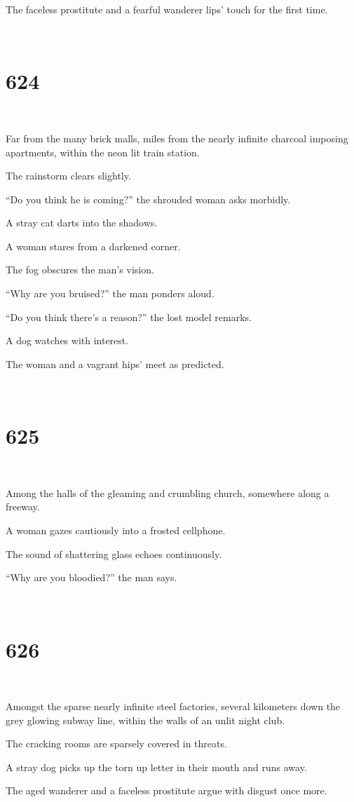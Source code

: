 \documentclass{report}
\begin{document}
The faceless prostitute and a fearful wanderer lips' touch for the first time.

~
\chapter*{624}
~

Far from the many brick malls, miles from the nearly infinite charcoal imposing apartments, within the neon lit train station.

The rainstorm clears slightly.

``Do you think he is coming?'' the shrouded woman asks morbidly.

A stray cat darts into the shadows.

A woman stares from a darkened corner.

The fog obscures the man's vision.

``Why are you bruised?'' the man ponders aloud.

``Do you think there's a reason?'' the lost model remarks.

A dog watches with interest.

The woman and a vagrant hips' meet as predicted.

~
\chapter*{625}
~

Among the halls of the gleaming and crumbling church, somewhere along a freeway.

A woman gazes cautiously into a frosted cellphone.

The sound of shattering glass echoes continuously.

``Why are you bloodied?'' the man says.

~
\chapter*{626}
~

Amongst the sparse nearly infinite steel factories, several kilometers down the grey glowing subway line, within the walls of an unlit night club.

The cracking rooms are sparsely covered in threats.

A stray dog picks up the torn up letter in their mouth and runs away.

The aged wanderer and a faceless prostitute argue with disgust once more.
\end{document}
